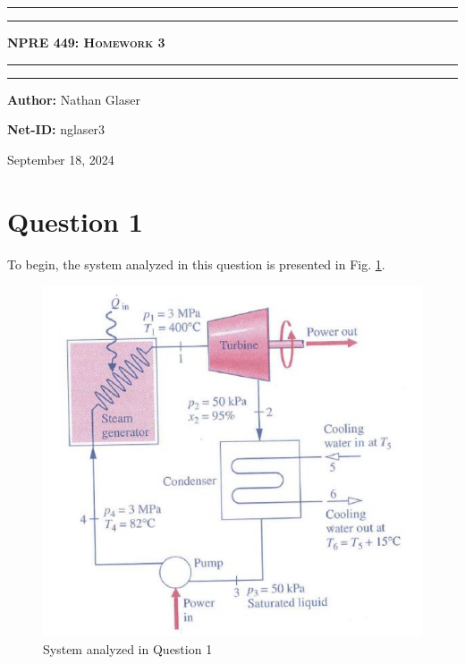 \documentclass{article}
\begin{document}
\begin{titlepage}

\centering
\scshape
\vspace{\baselineskip}

%
\rule{\textwidth}{1.6pt}\vspace*{-\baselineskip}\vspace*{2pt}
\rule{\textwidth}{0.4pt}

{\Huge \textbf{\textsc{NPRE 449: Homework 3 \\
\vspace{15pt}}}}

\rule{\textwidth}{0.4pt}\vspace*{-\baselineskip}\vspace{3.2pt}
\rule{\textwidth}{1.6pt}\vspace{6pt}
\vspace{1.5\baselineskip}


\large \centerline{\textbf{Author:} Nathan Glaser}
\large \centerline{\textbf{Net-ID:} nglaser3}
\quad

\vfill
\large \centerline{September 18, 2024}
%
\end{titlepage}

\tableofcontents
\newpage
{}

\section*{Question 1}

To begin, the system analyzed in this question is presented in Fig. \ref{fig:q1_config}.
\begin{figure}[!h!]
    \centering
    \includegraphics[width=0.8\linewidth]{hw5_q1_config.png}
    \caption{System analyzed in Question 1}
    \label{fig:q1_config}
\end{figure}
\end{document}
